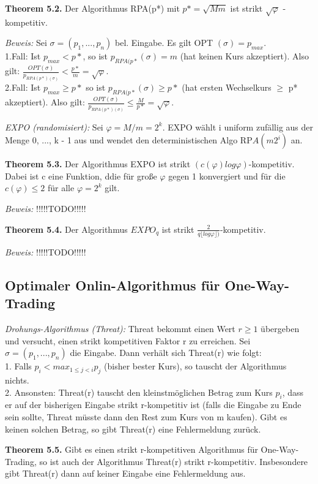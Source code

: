 \textbf{Theorem 5.2.} Der Algorithmus RPA(p*) mit $p* = \sqrt{Mm}$ ist strikt $\sqrt{\varphi}$ - kompetitiv.

\textit{Beweis:} Sei $\sigma = (p_{1}, ..., p_{n})$ bel. Eingabe. Es gilt OPT $(\sigma) = p_{max}$. \\
1.Fall: Ist $p_{max} < p*$, so ist $p_{RPA(p*}(\sigma) = m$ (hat keinen Kurs akzeptiert). Also gilt: $\tfrac{OPT(\sigma)}{p_{RPA(p*)(\sigma)}} < \tfrac{p*}{m} = \sqrt{\varphi}$.\\
2.Fall: Ist $p_{max} \ge p*$ so ist $p_{RPA(p*}(\sigma) \ge p*$ (hat ersten Wechselkurs $\ge$ p* akzeptiert). Also gilt: $\tfrac{OPT(\sigma)}{p_{RPA(p*)(\sigma)}} \le \tfrac{M}{p*} = \sqrt{\varphi}$.

\textit{EXPO (randomisiert):} Sei $\varphi = M / m = 2^k$. EXPO wählt i uniform zufällig aus der Menge {0, ..., k - 1} aus und wendet den deterministischen Algo RP$A(m2^{i})$ an.

\textbf{Theorem 5.3.} Der Algorithmus EXPO ist strikt $(c(\varphi)log\varphi)$-kompetitiv. Dabei ist c eine Funktion, ddie für große $\varphi$ gegen 1 konvergiert und für die $c(\varphi) \le 2$ für alle $\varphi = 2^k$ gilt.

\textit{Beweis:} !!!!!TODO!!!!!

\textbf{Theorem 5.4.} Der Algorithmus $EXPO_{q}$ ist strikt $\tfrac{2}{q\lfloor log\varphi \rfloor)}$-kompetitiv.

\textit{Beweis:} !!!!!TODO!!!!!

\subsection{Optimaler Onlin-Algorithmus für One-Way-Trading}

\textit{Drohungs-Algorithmus (Threat):} Threat bekommt einen Wert $r \ge 1$ übergeben und versucht, einen strikt kompetitiven Faktor r zu erreichen. Sei $\sigma = (p_{1}, ..., p_{n})$ die Eingabe. Dann verhält sich Threat(r) wie folgt:\\
1. Falls $p_{i} < max_{1 \le j < i}p_{j}$ (bisher bester Kurs), so tauscht der Algorithmus nichts.\\
2. Ansonsten: Threat(r) tauscht den kleinstmöglichen Betrag zum Kurs $p_{i}$, dass er auf der bisherigen Eingabe strikt r-kompetitiv ist (falls die Eingabe zu Ende sein sollte, Threat müsste dann den Rest zum Kurs von m kaufen). Gibt es keinen solchen Betrag, so gibt Threat(r) eine Fehlermeldung zurück.

\textbf{Theorem 5.5.} Gibt es einen strikt r-kompetitiven Algorithmus für One-Way-Trading, so ist auch der Algorithmus Threat(r) strikt r-kompetitiv. Insbesondere gibt Threat(r) dann auf keiner Eingabe eine Fehlermeldung aus.

